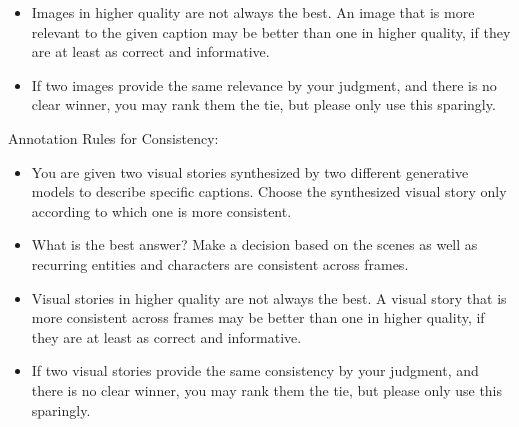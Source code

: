 \documentclass[10pt,twocolumn,letterpaper]{article}
\begin{document}
{\begin{itemize}
    \item Images in higher quality are not always the best. An image that is more relevant to the given caption may be better than one in higher quality, if they are at least as correct and informative.
    \item If two images provide the same relevance by your judgment, and there is no clear winner, you may rank them the tie, but please only use this sparingly.
\end{itemize}
Annotation Rules for Consistency:
\begin{itemize}
    \item You are given two visual stories synthesized by two different generative models to describe specific captions. Choose the synthesized visual story only according to which one is more consistent.
    \item What is the best answer? Make a decision based on the scenes as well as recurring entities and characters are consistent across frames.
    \item Visual stories in higher quality are not always the best. A visual story that is more consistent across frames may be better than one in higher quality, if they are at least as correct and informative.
    \item If two visual stories provide the same consistency by your judgment, and there is no clear winner, you may rank them the tie, but please only use this sparingly.
\end{itemize}
}
\end{document}
